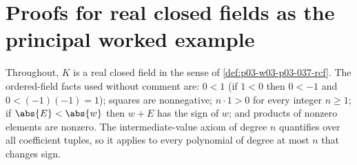 \section{Proofs for real closed fields as the principal worked example}
\label{sec:annex-p03-w03-p03-037-rcf}

Throughout, \(K\) is a real closed field in the sense of
\cref{def:p03-w03-p03-037-rcf}.  The ordered-field facts used without
comment are: \(0<1\) (if \(1<0\) then \(0<-1\) and \(0<(-1)(-1)=1\)); squares
are nonnegative; \(n\cdot1>0\) for every integer \(n\geq1\); if
\(\abs{E}<\abs{w}\) then \(w+E\) has the sign of \(w\); and products of
nonzero elements are nonzero.  The intermediate-value axiom of degree \(n\)
quantifies over all coefficient tuples, so it applies to every polynomial
of degree at most \(n\) that changes sign.

